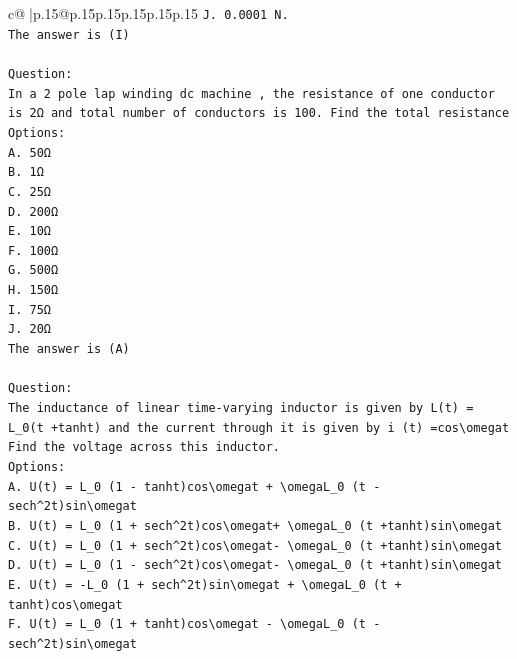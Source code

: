 \documentclass{article}
\begin{document}
{\begin{supertabular}{c@{$\;$}|p{.15\linewidth}@{}p{.15\linewidth}p{.15\linewidth}p{.15\linewidth}p{.15\linewidth}p{.15\linewidth}}
{{{\texttt{J. 0.0001 N.} \\
\texttt{The answer is (I)} \\
\\ 
\texttt{Question:} \\
\texttt{In a 2 pole lap winding dc machine , the resistance of one conductor is 2Ω and total number of conductors is 100. Find the total resistance} \\
\texttt{Options:} \\
\texttt{A. 50Ω} \\
\texttt{B. 1Ω} \\
\texttt{C. 25Ω} \\
\texttt{D. 200Ω} \\
\texttt{E. 10Ω} \\
\texttt{F. 100Ω} \\
\texttt{G. 500Ω} \\
\texttt{H. 150Ω} \\
\texttt{I. 75Ω} \\
\texttt{J. 20Ω} \\
\texttt{The answer is (A)} \\
\\ 
\texttt{Question:} \\
\texttt{The inductance of linear time{-}varying inductor is given by L(t) = L\_0(t +tanht) and the current through it is given by i (t) =cos\textbackslash{}omegat Find the voltage across this inductor.} \\
\texttt{Options:} \\
\texttt{A. U(t) = L\_0 (1 {-} tanht)cos\textbackslash{}omegat + \textbackslash{}omegaL\_0 (t {-} sech\^{}2t)sin\textbackslash{}omegat} \\
\texttt{B. U(t) = L\_0 (1 + sech\^{}2t)cos\textbackslash{}omegat+ \textbackslash{}omegaL\_0 (t +tanht)sin\textbackslash{}omegat} \\
\texttt{C. U(t) = L\_0 (1 + sech\^{}2t)cos\textbackslash{}omegat{-} \textbackslash{}omegaL\_0 (t +tanht)sin\textbackslash{}omegat} \\
\texttt{D. U(t) = L\_0 (1 {-} sech\^{}2t)cos\textbackslash{}omegat{-} \textbackslash{}omegaL\_0 (t +tanht)sin\textbackslash{}omegat} \\
\texttt{E. U(t) = {-}L\_0 (1 + sech\^{}2t)sin\textbackslash{}omegat + \textbackslash{}omegaL\_0 (t + tanht)cos\textbackslash{}omegat} \\
\texttt{F. U(t) = L\_0 (1 + tanht)cos\textbackslash{}omegat {-} \textbackslash{}omegaL\_0 (t {-} sech\^{}2t)sin\textbackslash{}omegat} \\
}}}
\end{supertabular}}
\end{document}

